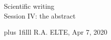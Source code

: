 \documentclass[
	onepage, 
	12pt,
	hyperref={
		colorlinks = true,
		linkcolor = blue,
		urlcolor  = blue,
		citecolor = blue,
		anchorcolor = blue
	},
]{beamer}
\author{RA}
\def\Bottom#1{\vskip 0pt plus 1filll #1}
\begin{document}


\begin{frame}[plain,t]
	\begin{center}
        \vspace{1cm}
		Scientific writing
		\\
		{\small\color{gray} Session IV: the abstract}

		\vspace{1cm}

	\end{center}
	
	
	\Bottom{
		\footnotesize
		R.A.
		\hfill
		ELTE, Apr 7, 2020
		\\ {\ }
	}
\end{frame}



\end{document}
